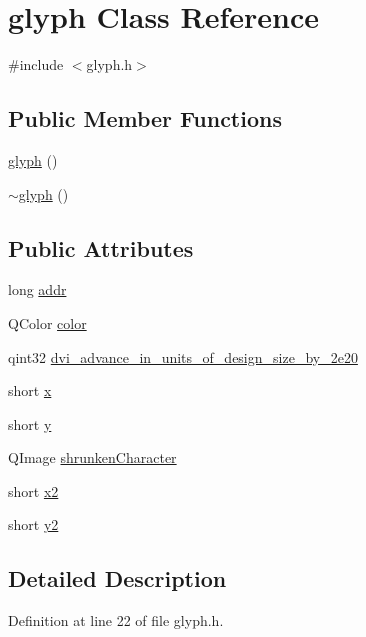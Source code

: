 \hypertarget{classglyph}{\section{glyph Class Reference}
\label{classglyph}
}


{\ttfamily \#include $<$glyph.\+h$>$}

\subsection*{Public Member Functions}
\begin{DoxyCompactItemize}
\item 
\hyperlink{classglyph_a5f16a20707767d98ab221d650c3341d6}{glyph} ()
\item 
\hyperlink{classglyph_a8061fd0adb3552de70f043b762a00da9}{$\sim$glyph} ()
\end{DoxyCompactItemize}
\subsection*{Public Attributes}
\begin{DoxyCompactItemize}
\item 
long \hyperlink{classglyph_a11666f9bdd93248a6c58b69113cbd7b0}{addr}
\item 
Q\+Color \hyperlink{classglyph_ab4847af7a7b13322d5651fe47735c8dd}{color}
\item 
qint32 \hyperlink{classglyph_ad5d39f93c1c63bd072b23783cd9ac7ce}{dvi\+\_\+advance\+\_\+in\+\_\+units\+\_\+of\+\_\+design\+\_\+size\+\_\+by\+\_\+2e20}
\item 
short \hyperlink{classglyph_aa030c1619dd07d04f843c5ee9a54dde1}{x}
\item 
short \hyperlink{classglyph_ac9b8f10a7be77024f34c723eeea34bf3}{y}
\item 
Q\+Image \hyperlink{classglyph_aeefa28a926bdd7a24595dbdc7cdf504c}{shrunken\+Character}
\item 
short \hyperlink{classglyph_a07a7aa840a9a34588a5cc02508ac5e6d}{x2}
\item 
short \hyperlink{classglyph_afa1607f13eb1db99a5a3b1c92d47db7f}{y2}
\end{DoxyCompactItemize}


\subsection{Detailed Description}


Definition at line 22 of file glyph.\+h.



